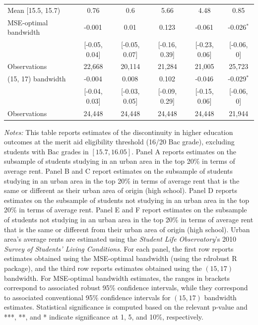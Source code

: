 \begin{table}[H]
{\begin{threeparttable}
\begin{tabular}[t]{lccccc}
\hspace{1em}Mean [15.5, 15.7) & 0.76 & 0.6 & 5.66 & 4.48 & 0.85\\
\hspace{1em}MSE-optimal bandwidth & -0.001$^{}$ & 0.01$^{}$ & 0.123$^{}$ & -0.061$^{}$ & -0.026$^{*}$\\
\hspace{1em} & {}[-0.05, 0.04] & {}[-0.05, 0.07] & {}[-0.16, 0.39] & {}[-0.23, 0.06] & {}[-0.06, 0]\\
\hspace{1em}Observations & 22,668 & 20,114 & 21,284 & 21,005 & 25,723\\
\hspace{1em}(15, 17) bandwidth & -0.004$^{}$ & 0.008$^{}$ & 0.102$^{}$ & -0.046$^{}$ & -0.029$^{*}$\\
\hspace{1em} & {}[-0.04, 0.03] & {}[-0.03, 0.05] & {}[-0.09, 0.29] & {}[-0.15, 0.06] & {}[-0.06, 0]\\
\hspace{1em}Observations & 24,448 & 24,448 & 24,448 & 24,448 & 21,944\\
\bottomrule
\end{tabular}
\begin{tablenotes}[para]
\item \textit{Notes:} This table reports estimates of the discontinuity in higher education outcomes at the merit aid eligibility threshold (16/20 Bac grade), excluding students with Bac grades in $[15.7, 16.05]$. Panel A reports estimates on the subsample of students studying in an urban area in the top 20\% in terms of average rent. Panel B and C report estimates on the subsample of students studying in an urban area in the top 20\% in terms of average rent that is the same or different as their urban area of origin (high school). Panel D reports estimates on the subsample of students not studying in an urban area in the top 20\% in terms of average rent. Panel E and F report estimates on the subsample of students not studying in an urban area in the top 20\% in terms of average rent that is the same or different from their urban area of origin (high school). Urban area's average rents are estimated using the \textit{Student Life Observatory}’s 2010 \textit{Survey of Students’ Living Conditions}. For each panel, the first row reports estimates obtained using the MSE-optimal bandwidth (using the rdrobust R package), and the third row reports estimates obtained using the $(15, 17)$ bandwidth. For MSE-optimal bandwidth estimates, the ranges in brackets correspond to associated robust 95\% confidence intervals, while they correspond to associated conventional 95\% confidence intervals for $(15, 17)$ bandwidth estimates. Statistical significance is computed based on the relevant p-value and ***, **, and * indicate significance at 1, 5, and 10\%, respectively.
\end{tablenotes}
\end{threeparttable}}
\end{table}
